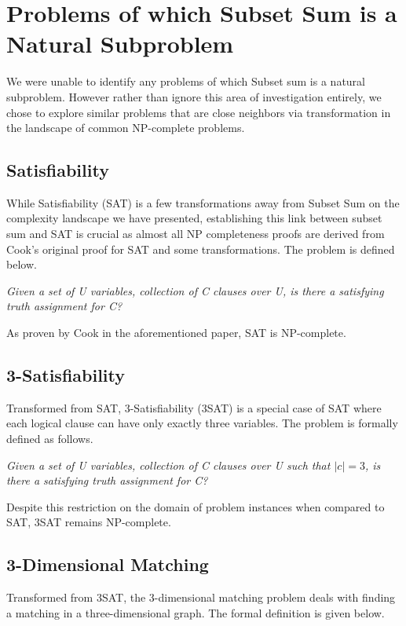 \documentclass{article}
\begin{document}
\section{Problems of which Subset Sum is a Natural Subproblem}

We were unable to identify any problems of which Subset sum is a natural subproblem.
However rather than ignore this area of investigation entirely, we chose to explore
similar problems that are close neighbors via transformation in the landscape of common
NP-complete problems.

\subsection{Satisfiability} 

While Satisfiability (SAT) is a few transformations away from Subset Sum on the 
complexity landscape we have presented, establishing this link between subset sum and SAT is
crucial as almost all NP completeness proofs are derived from Cook's original proof for SAT and
some transformations. The problem is defined below.

\textit{Given a set of U variables, collection of C clauses over U, is there a satisfying truth assignment for C?}

As proven by Cook in the aforementioned paper, SAT is NP-complete.

\subsection{3-Satisfiability}

Transformed from SAT, 3-Satisfiability (3SAT) is a special case of SAT where each logical 
clause can have only exactly three variables. The problem is formally defined as follows.

\textit{Given a set of U variables, collection of C clauses over U such that $|c| = 3$, is there a satisfying truth assignment for C?}

Despite this restriction on the domain of problem instances when compared to SAT, 
3SAT remains NP-complete.

\subsection{3-Dimensional Matching} 

Transformed from 3SAT, the 3-dimensional matching problem deals with finding a matching in 
a three-dimensional graph. The formal definition is given below.
\end{document}
